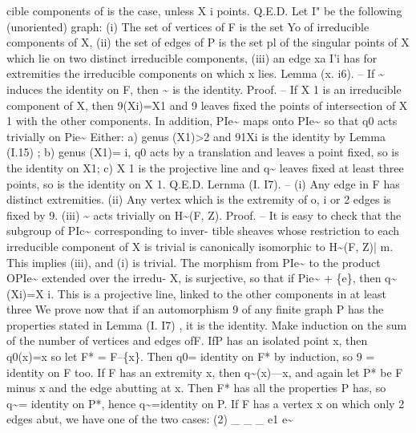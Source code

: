 \documentclass[11pt]{article}
\theoremstyle{plain}
\theoremstyle{definition}
\theoremstyle{remark}
\begin{document}
cible components of is the case, unless X i points. Q.E.D. Let I" be the following (unoriented) graph: (i) The set of vertices of F is the set Yo of irreducible components of X, (ii) the set of edges of P is the set pl of the singular points of X which lie on two distinct irreducible components, (iii) an edge xa I'i has for extremities the irreducible components on which x lies. Lemma (x. i6). -- If \textasciitilde{} induces the identity on F, then \textasciitilde{} is the identity. Proof. -- If X 1 is an irreducible component of X, then 9(Xi)=X1 and 9 leaves fixed the points of intersection of X 1 with the other components. In addition, PIe\textasciitilde{} maps onto PIe\textasciitilde{} so that q0 acts trivially on Pie\textasciitilde{} Either: a) genus (X1)>2 and 91Xi is the identity by Lemma (I.15) ; b) genus (X1)= i, q0 acts by a translation and leaves a point fixed, so is the identity on X1; c) X 1 is the projective line and q\textasciitilde{} leaves fixed at least three points, so is the identity on X 1. Q.E.D. Lernma (I. I7). -- (i) Any edge in F has distinct extremities. (ii) Any vertex which is the extremity of o, i or 2 edges is fixed by 9. (iii) \textasciitilde{} acts trivially on H\textasciitilde{}(F, Z). Proof. -- It is easy to check that the subgroup of PIc\textasciitilde{} corresponding to inver- tible sheaves whose restriction to each irreducible component of X is trivial is canonically isomorphic to H\textasciitilde{}(F, Z)| m. This implies (iii), and (i) is trivial. The morphism from PIe\textasciitilde{} to the product OPIe\textasciitilde{} extended over the irredu- X, is surjective, so that if Pie\textasciitilde{} + \{e\}, then q\textasciitilde{}(Xi)=X i. This is a projective line, linked to the other components in at least three We prove now that if an automorphism 9 of any finite graph P has the properties stated in Lemma (I. I7) , it is the identity. Make induction on the sum of the number of vertices and edges ofF. IfP has an isolated point x, then q0(x)=x so let F* = F--\{x\}. Then q0= identity on F* by induction, so 9 = identity on F too. If F has an extremity x, then q\textasciitilde{}(x)---x, and again let P* be F minus x and the edge abutting at x. Then F* has all the properties P has, so q\textasciitilde{}= identity on P*, hence q\textasciitilde{}=identity on P. If F has a vertex x on which only 2 edges abut, we have one of the two cases: (2) \_ \_ \_ e1 e\textasciitilde{}
\end{document}
